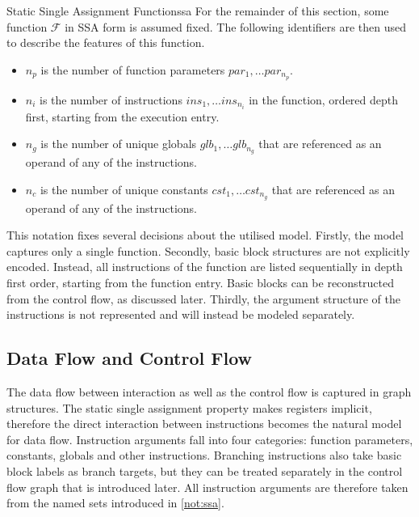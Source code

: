 \begin{notation}{Static Single Assignment Function}{ssa}
    For the remainder of this section, some function $\mathcal F$ in SSA form is
    assumed fixed. 
    The following identifiers are then used to describe the features of this
    function.

    \begin{itemize}
    \item $n_p$ is the number of function parameters $par_1,\dots par_{n_p}$.
    \item $n_i$ is the number of instructions $ins_1,\dots ins_{n_i}$ in the
          function, ordered depth first, starting from the execution entry.
    \item $n_g$ is the number of unique globals $glb_1,\dots glb_{n_g}$ that are
          referenced as an operand of any of the instructions.
    \item $n_c$ is the number of unique constants $cst_1,\dots cst_{n_g}$ that
          are referenced as an operand of any of the instructions.
    \end{itemize}
\end{notation}

    This notation fixes several decisions about the utilised model.
    Firstly, the model captures only a single function.
    Secondly, basic block structures are not explicitly encoded.
    Instead, all instructions of the function are listed sequentially in depth
    first order, starting from the function entry.
    Basic blocks can be reconstructed from the control flow, as discussed later.
    Thirdly, the argument structure of the instructions is not represented and
    will instead be modeled separately.

\subsection{Data Flow and Control Flow}

    The data flow between interaction as well as the control flow is captured in
    graph structures.
    The static single assignment property makes registers implicit, therefore
    the direct interaction between instructions becomes the natural model for
    data flow.
    Instruction arguments fall into four categories: function parameters,
    constants, globals and other instructions.
    Branching instructions also take basic block labels as branch targets,
    but they can be treated separately in the control flow graph that is
    introduced later.
    All instruction arguments are therefore taken from the named sets introduced
    in \autoref{not:ssa}.

